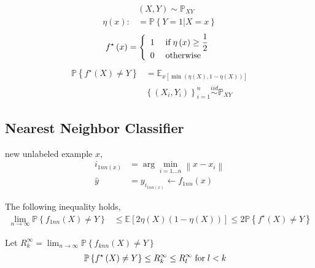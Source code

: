\documentclass{article}
\begin{document}
\begin{align*}
&\left(X , Y\right) \sim  \mathbb{P}_{X Y}
\\ \eta\left(x\right) :&= \mathbb{P}\left\{Y = 1 | X = x \right\}
\end{align*}
\[ f^\star \left(x\right) =\left\{ \begin{array}{ll}
1& \text{\;if\;} \eta\left(x\right) \geq  \dfrac{1}{2} \\
0& \text{\;otherwise\;} \\
\end{array}\right. \]
\begin{align*}
\mathbb{P}\left\{f^\star \left(X\right) \neq  Y\right\} &= \mathbb{E}_{x\left[\displaystyle\min\left(\eta\left(X\right), 1 - \eta\left(X\right)\right)\right]}
\\ &\left\{\left(X_{i}, Y_{i}\right)\right\}_{i=1}^{n} \stackrel{iid}{\sim} \mathbb{P}_{X Y}
\end{align*}


\subsection{Nearest Neighbor Classifier}
new unlabeled example $x, $
\begin{align*}
i_{1nn\left(x\right)} &= \arg\displaystyle\min_{i = 1 ... n} \left\|x - x_{i}\right\|
\\ \hat{y} &= y_{i_{1nn\left(x\right)}} \leftarrow f_{1nn} \left(x\right)
\end{align*}
\begin{thm} \label{thm:1nn} 
The following inequality holds,
\begin{align*}
\lim_{n \to  \infty} \mathbb{P}\left\{f_{1nn} \left(X\right) \neq  Y\right\} &\leq  \mathbb{E}\left[2 \eta\left(X\right) \left(1 - \eta\left(X\right)\right)\right] \leq  2 \mathbb{P}\left\{f^\star \left(X\right) \neq  Y \right\}
\end{align*}\end{thm}
\begin{thm} \label{thm:1kmm} 
Let $R_{k}^{\infty} = \lim_{n \to  \infty} \mathbb{P}\left\{f_{knn}\left(X\right) \neq  Y \right\}$
\begin{align*}
\mathbb{P}\left\{f^\star \left(X\right) \neq  Y\right\} &\leq  R_{k}^{\infty} \leq  R_{l}^{\infty} \text{\;for\;} l  < k 
\end{align*}\end{thm}
\end{document}
